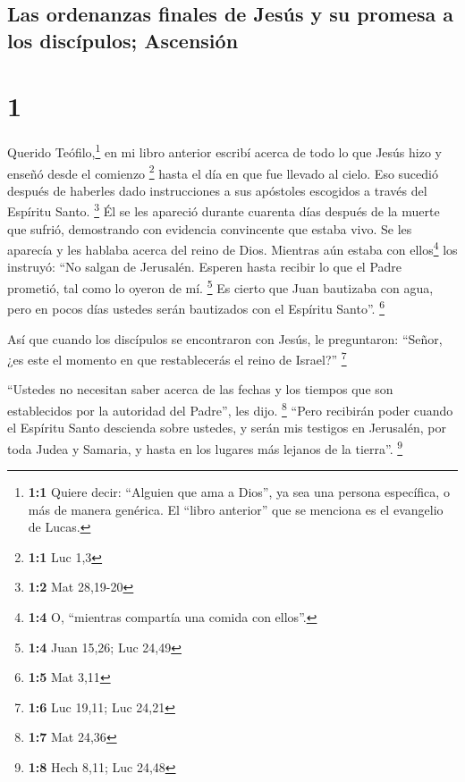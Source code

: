 \hypertarget{las-ordenanzas-finales-de-jesuxfas-y-su-promesa-a-los-discuxedpulos-ascensiuxf3n}{%
\subsection{Las ordenanzas finales de Jesús y su promesa a los
discípulos;
Ascensión}\label{las-ordenanzas-finales-de-jesuxfas-y-su-promesa-a-los-discuxedpulos-ascensiuxf3n}}

\hypertarget{section}{%
\section{1}\label{section}}

 Querido Teófilo,\footnote{\textbf{1:1} Quiere decir:
  ``Alguien que ama a Dios'', ya sea una persona específica, o más de
  manera genérica. El ``libro anterior'' que se menciona es el evangelio
  de Lucas.} en mi libro anterior escribí acerca de todo lo que Jesús
hizo y enseñó desde el comienzo \footnote{\textbf{1:1} Luc 1,3}
 hasta el día en que fue llevado al cielo. Eso sucedió
después de haberles dado instrucciones a sus apóstoles escogidos a
través del Espíritu Santo. \footnote{\textbf{1:2} Mat 28,19-20}
 Él se les apareció durante cuarenta días después de la
muerte que sufrió, demostrando con evidencia convincente que estaba
vivo. Se les aparecía y les hablaba acerca del reino de Dios.
 Mientras aún estaba con ellos\footnote{\textbf{1:4} O,
  ``mientras compartía una comida con ellos''.} los instruyó: ``No
salgan de Jerusalén. Esperen hasta recibir lo que el Padre prometió, tal
como lo oyeron de mí. \footnote{\textbf{1:4} Juan 15,26; Luc 24,49}
 Es cierto que Juan bautizaba con agua, pero en pocos días
ustedes serán bautizados con el Espíritu Santo''. \footnote{\textbf{1:5}
  Mat 3,11}

 Así que cuando los discípulos se encontraron con Jesús,
le preguntaron: ``Señor, ¿es este el momento en que restablecerás el
reino de Israel?'' \footnote{\textbf{1:6} Luc 19,11; Luc 24,21}

 ``Ustedes no necesitan saber acerca de las fechas y los
tiempos que son establecidos por la autoridad del Padre'', les dijo.
\footnote{\textbf{1:7} Mat 24,36}  ``Pero recibirán poder
cuando el Espíritu Santo descienda sobre ustedes, y serán mis testigos
en Jerusalén, por toda Judea y Samaria, y hasta en los lugares más
lejanos de la tierra''. \footnote{\textbf{1:8} Hech 8,11; Luc 24,48}

